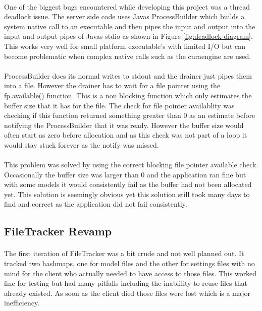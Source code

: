 \paragraph{}
One of the biggest bugs encountered while developing this project was a thread deadlock issue. 
The server side code uses Javas ProcessBuilder which builds a system native call to an executable and then pipes the input and output into the input and output pipes of Javas stdio as shown in Figure \ref{fig:deadlock-diagram}.
This works very well for small platform executable’s with limited I/O but can become problematic when complex native calls such as the curaengine are used.

\paragraph{}
ProcessBuilder does its normal writes to stdout and the drainer just pipes them into a file. 
However the drainer has to wait for a file pointer using the fp.available() function. 
This is a non blocking function which only estimates the buffer size that it has for the file. 
The check for file pointer availablity was checking if this function returned something greater than 0 as an estimate before notifying the ProcessBuilder that it was ready. 
However the buffer size would often start as zero before allocation and as this check was not part of a loop it would stay stuck forever as the notify was missed.

\paragraph{}
This problem was solved by using the correct blocking file pointer available check. 
Occasionally the buffer size was larger than 0 and the application ran fine but with some models it would consistently fail as the buffer had not been allocated yet.
This solution is seemingly obvious yet this solution still took many days to find and correct as the application did not fail consistently.

\subsection{FileTracker Revamp}
\paragraph{}
The first iteration of FileTracker was a bit crude and not well planned out. 
It tracked two hashmaps, one for model files and the other for settings files with no mind for the client who actually needed to have access to those files. 
This worked fine for testing but had many pitfalls including the inablility to reuse files that already existed. 
As soon as the client died those files were lost which is a major inefficiency.

